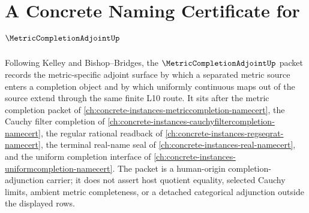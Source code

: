 \chapter{A Concrete Naming Certificate for $\MetricCompletionAdjointUp$}
\label{ch:concrete-instances-metric-completion-adjoint-namecert}

Following Kelley and Bishop--Bridges, the $\MetricCompletionAdjointUp$ packet records the metric-specific adjoint surface by which a separated metric source enters a completion object and by which uniformly continuous maps out of the source extend through the same finite L10 route. It sits after the metric completion packet of \autoref{ch:concrete-instances-metriccompletion-namecert}, the Cauchy filter completion of \autoref{ch:concrete-instances-cauchyfiltercompletion-namecert}, the regular rational readback of \autoref{ch:concrete-instances-regseqrat-namecert}, the terminal real-name seal of \autoref{ch:concrete-instances-real-namecert}, and the uniform completion interface of \autoref{ch:concrete-instances-uniformcompletion-namecert}. The packet is a human-origin completion-adjunction carrier; it does not assert host quotient equality, selected Cauchy limits, ambient metric completeness, or a detached categorical adjunction outside the displayed rows.

